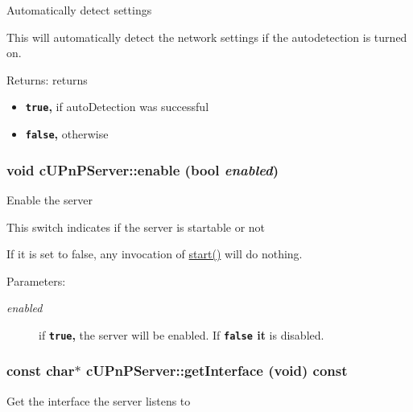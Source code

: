 Automatically detect settings

This will automatically detect the network settings if the autodetection is turned on.

\begin{Desc}
\item[Returns:]returns\begin{itemize}
\item {\bf {\tt true},} if autoDetection was successful\item {\bf {\tt false},} otherwise \end{itemize}
\end{Desc}
\hypertarget{classcUPnPServer_4935ab1fbcc03279193e0f9fa675fb8b}{
\subsubsection[{enable}]{\setlength{\rightskip}{0pt plus 5cm}void cUPnPServer::enable (bool {\em enabled})}}
\label{classcUPnPServer_4935ab1fbcc03279193e0f9fa675fb8b}


Enable the server

This switch indicates if the server is startable or not

If it is set to false, any invocation of \hyperlink{classcUPnPServer_811d90c5aadc75bc48670757def1c21e}{start()} will do nothing.

\begin{Desc}
\item[Parameters:]
\begin{description}
\item[{\em enabled}]if {\bf {\tt true},} the server will be enabled. If {\bf {\tt false} it} is disabled. \end{description}
\end{Desc}
\hypertarget{classcUPnPServer_e28dd555ac861850c9a2bbd22d9a7d3a}{
\subsubsection[{getInterface}]{\setlength{\rightskip}{0pt plus 5cm}const char$\ast$ cUPnPServer::getInterface (void) const}}
\label{classcUPnPServer_e28dd555ac861850c9a2bbd22d9a7d3a}


Get the interface the server listens to

